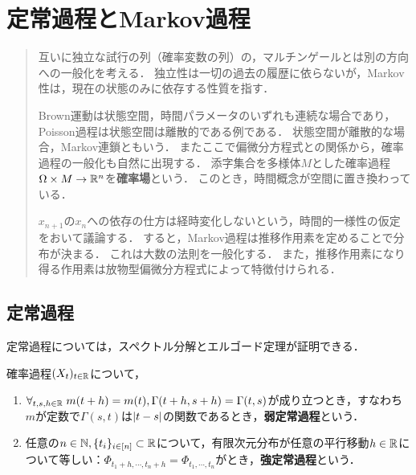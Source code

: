 \documentclass[uplatex,dvipdfmx]{jsreport}
\begin{document}
\chapter{定常過程とMarkov過程}

\begin{quote}
    互いに独立な試行の列（確率変数の列）の，マルチンゲールとは別の方向への一般化を考える．
    独立性は一切の過去の履歴に依らないが，Markov性は，現在の状態のみに依存する性質を指す．

    Brown運動は状態空間，時間パラメータのいずれも連続な場合であり，Poisson過程は状態空間は離散的である例である．
    状態空間が離散的な場合，Markov連鎖ともいう．
    またここで偏微分方程式との関係から，確率過程の一般化も自然に出現する．
    添字集合を多様体$M$とした確率過程$\Omega\times M\to\mathbb{R}^n$を\textbf{確率場}という．
    このとき，時間概念が空間に置き換わっている．

    $x_{n+1}$の$x_n$への依存の仕方は経時変化しないという，時間的一様性の仮定をおいて議論する．
    すると，Markov過程は推移作用素を定めることで分布が決まる．
    これは大数の法則を一般化する．
    また，推移作用素になり得る作用素は放物型偏微分方程式によって特徴付けられる．
\end{quote}

\section{定常過程}

\begin{tcolorbox}[colframe=ForestGreen, colback=ForestGreen!10!white,breakable,colbacktitle=ForestGreen!40!white,coltitle=black,fonttitle=\bfseries\sffamily,
title=]
    定常過程については，スペクトル分解とエルゴード定理が証明できる．
\end{tcolorbox}

\begin{definition}
    確率過程$(X_t)_{t\in\mathbb{R}}$について，
    \begin{enumerate}
        \item $\forall_{t,s,h\in\mathbb{R}}\;m(t+h)=m(t),\Gamma(t+h,s+h)=\Gamma(t,s)$が成り立つとき，すなわち$m$が定数で$\Gamma(s,t)$は$\lvert t-s\rvert$の関数であるとき，\textbf{弱定常過程}という．
        \item 任意の$n\in\mathbb{N},\{t_i\}_{i\in[n]}\subset\mathbb{R}$について，有限次元分布が任意の平行移動$h\in\mathbb{R}$について等しい：$\Phi_{t_1+h,\cdots,t_n+h}=\Phi_{t_1,\cdots,t_n}$がとき，\textbf{強定常過程}という．
    \end{enumerate}
\end{definition}
\end{document}
